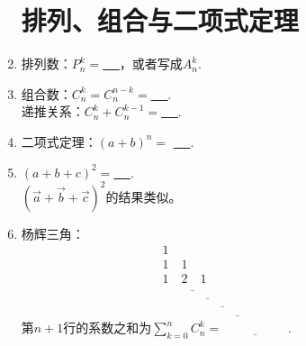\documentclass{article}
\newif\ifte
\newcommand{\q}{\quad}
\renewcommand{\vec}{\overrightarrow}
\begin{document}
\begin{multicols}{2}
\begin{enumerate}[leftmargin=20pt]
\section{排列、组合与二项式定理}
\item 排列数：$ P_n^k= $\underline{\ \ifte $ \dfrac{n!}{(n-k)!} $
     \else \hspace{2cm} \fi\ }，或者写成$ A_n^k $. 

\item 组合数：$ C_n^k=C_n^{n-k}= $\underline{\ \ifte 
$ \dfrac{n!}{k!(n-k)!} $ \else \hspace{2cm} \fi\ }. \\
递推关系：$ C_n^k+C_n^{k-1}= $\underline{\ \ifte $ C_{n+1}^k $ 
\else \hspace{2cm} \fi\ }. 

\item 二项式定理：$ (a+b)^n= $ \underline{\ \ifte 
$ \sum\limits_{k=0}^nC_n^ka^kb^{n-k} $ \else \hspace{2cm} \fi\ }.

\item $ (a+b+c)^2 = $\underline{\ \ifte 
    $ a^2+b^2+c^2+2(ab+ac+bc) $ \else \hspace{5cm} \fi\ }. \\
$ (\vec{a}+\vec{b}+\vec{c})^2 $的结果类似。

\item 杨辉三角：
\vspace{-3mm}
\begin{gather*}
    1 \\
    1\q 1 \\
    1\q 2 \q 1 \\
    \ifte 
    \underline{1\q 3 \q 3 \q 1} \\
    \underline{1\q 4 \q 6 \q 4 \q 1} \\
    \underline{1\q 5 \q 10 \q 10 \q 5 \q 1} \\
    \underline{1\q 6 \q 15 \q 20 \q 15 \q 6 \q 1} 
    \else
    \underline{\hspace{2cm}} \\
    \underline{\hspace{3cm}} \\
    \underline{\hspace{4cm}} \\
    \underline{\hspace{5cm}}   
    \fi 
\end{gather*}
第$ n+1 $行的系数之和为$ \sum\limits_{k=0}^{n} C_n^k=
\underline{\ \ifte 2^{n} \else \hspace{2cm} \fi\ } $.


\end{enumerate}
\end{multicols}
\end{document}
